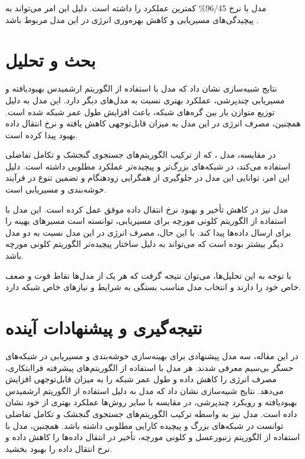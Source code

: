 \documentclass[12pt, onecolumn, a4paper]{article}
\begin{document}
مدل  با نرخ 96/45\% کمترین عملکرد را داشته است. دلیل این امر می‌تواند به پیچیدگی‌های مسیریابی و کاهش بهره‌وری انرژی در این مدل مربوط باشد \cite{ref10}.

\section{بحث و تحلیل}

نتایج شبیه‌سازی نشان داد که مدل  با استفاده از الگوریتم ارشمیدس بهبودیافته و مسیریابی چندپرشی، عملکرد بهتری نسبت به مدل‌های دیگر دارد. این مدل به دلیل توزیع متوازن بار بین گره‌های شبکه، باعث افزایش طول عمر شبکه شده است. همچنین، مصرف انرژی در این مدل به میزان قابل‌توجهی کاهش یافته و نرخ انتقال داده بهبود پیدا کرده است. 

در مقایسه، مدل ، که از ترکیب الگوریتم‌های جستجوی گنجشک و تکامل تفاضلی استفاده می‌کند، در شبکه‌های بزرگ‌تر و پیچیده‌تر عملکرد مطلوبی داشته است. دلیل این امر، توانایی این مدل در جلوگیری از همگرایی زودهنگام و تضمین تنوع در فرآیند خوشه‌بندی و مسیریابی است. 

مدل  نیز در کاهش تأخیر و بهبود نرخ انتقال داده موفق عمل کرده است. این مدل با استفاده از الگوریتم کلونی مورچه برای مسیریابی، توانسته است مسیرهای بهینه را برای ارسال داده‌ها پیدا کند. با این حال، مصرف انرژی در این مدل نسبت به دو مدل دیگر بیشتر بوده است که می‌تواند به دلیل ساختار پیچیده‌تر الگوریتم کلونی مورچه باشد.

با توجه به این تحلیل‌ها، می‌توان نتیجه گرفت که هر یک از مدل‌ها نقاط قوت و ضعف خاص خود را دارند و انتخاب مدل مناسب بستگی به شرایط و نیازهای خاص شبکه دارد.

\section{نتیجه‌گیری و پیشنهادات آینده}

در این مقاله، سه مدل پیشنهادی برای بهینه‌سازی خوشه‌بندی و مسیریابی در شبکه‌های حسگر بی‌سیم معرفی شدند. هر مدل با استفاده از الگوریتم‌های پیشرفته فراابتکاری، مصرف انرژی را کاهش داده و طول عمر شبکه را به میزان قابل‌توجهی افزایش می‌دهد. نتایج شبیه‌سازی نشان داد که مدل  به دلیل استفاده از الگوریتم ارشمیدس بهبودیافته و رویکرد چندپرشی، در مقایسه با سایر روش‌ها عملکرد بهتری از خود نشان داده است. مدل  نیز به واسطه ترکیب الگوریتم‌های جستجوی گنجشک و تکامل تفاضلی توانست در شبکه‌های بزرگ و پیچیده کارایی مطلوبی داشته باشد. همچنین، مدل  با استفاده از الگوریتم زنبورعسل و کلونی مورچه، تأخیر در انتقال داده‌ها را کاهش داده و نرخ انتقال داده را بهبود بخشید.
\end{document}
